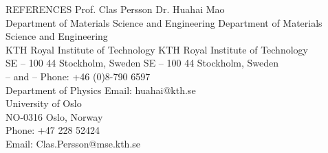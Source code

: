 \documentclass{resume} %
\begin{document}
\begin{rSection}{REFERENCES}
 {Prof. Clas Persson} \hspace*{54.3mm}  {Dr. Huahai Mao}  \\
Department of Materials Science and Engineering   \hspace*{2mm}  Department of Materials Science and Engineering \\
KTH Royal Institute of Technology \hspace*{26mm} KTH Royal Institute of Technology \\
SE – 100 44 Stockholm, Sweden \hspace*{32mm} SE – 100 44 Stockholm, Sweden \\
 -- and -- \hspace*{73.5mm} Phone: +46 (0)8-790 6597 \\
Department of Physics \hspace*{47.8mm} Email: huahai@kth.se  \\
University of Oslo \\
NO-0316 Oslo, Norway \\
Phone: +47 228 52424\\
Email: Clas.Persson@mse.kth.se \\

 
\end{rSection}








\end{document}
